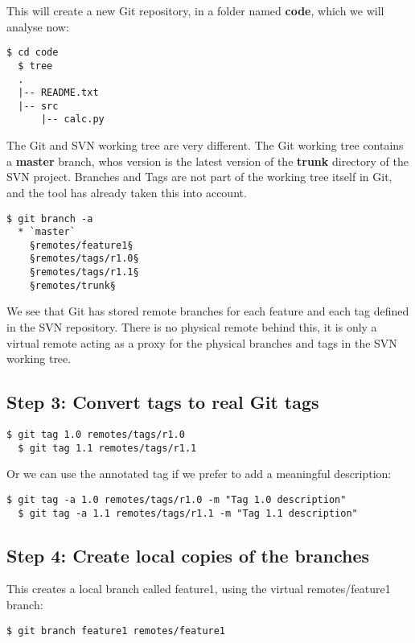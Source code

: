 \documentclass{../common/tufte-latex/tufte-handout}
\begin{document}
This will create a new Git repository, in a folder named \textbf{code}, which we will analyse now:

\begin{lstlisting}[style=BashInputStyle]
  $ cd code
  $ tree
  .
  |-- README.txt
  |-- src
      |-- calc.py
\end{lstlisting}

The Git and SVN working tree are very different.
The Git working tree contains a \textbf{master} branch, whos version is the latest version of the \textbf{trunk} directory of the SVN project.
Branches and Tags are not part of the working tree itself in Git, and the tool has already taken this into account.

\begin{lstlisting}[style=BashInputStyle]
  $ git branch -a
  * `master`
    §remotes/feature1§
    §remotes/tags/r1.0§
    §remotes/tags/r1.1§
    §remotes/trunk§
\end{lstlisting}

We see that Git has stored remote branches for each feature and each tag defined in the SVN repository.
There is no physical remote behind this, it is only a virtual remote acting as a proxy for the physical branches and tags in the SVN working tree.

\subsection{Step 3: Convert tags to real Git tags}

\begin{lstlisting}[style=BashInputStyle]
  $ git tag 1.0 remotes/tags/r1.0
  $ git tag 1.1 remotes/tags/r1.1
\end{lstlisting}

Or we can use the annotated tag if we prefer to add a meaningful description:

\begin{lstlisting}[style=BashInputStyle]
  $ git tag -a 1.0 remotes/tags/r1.0 -m "Tag 1.0 description"
  $ git tag -a 1.1 remotes/tags/r1.1 -m "Tag 1.1 description"
\end{lstlisting}

\subsection{Step 4: Create local copies of the branches}

This creates a local branch called feature1, using the virtual remotes/feature1 branch: 
\begin{lstlisting}[style=BashInputStyle]
  $ git branch feature1 remotes/feature1
\end{lstlisting}
\end{document}
